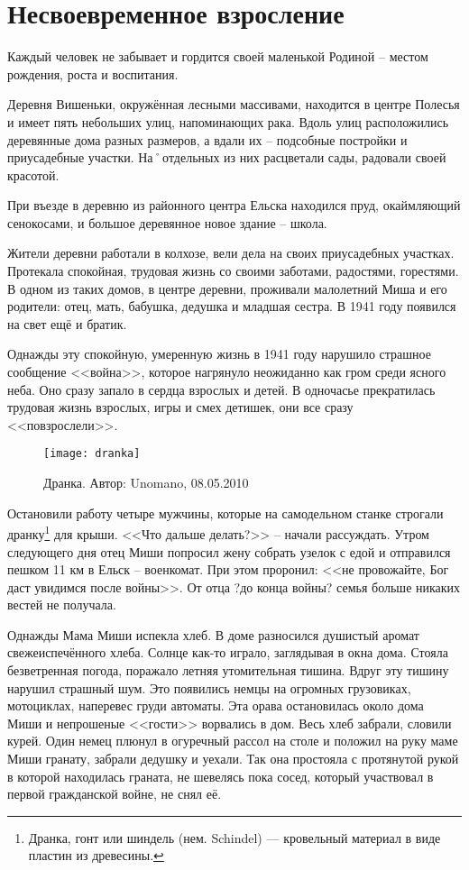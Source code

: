 ﻿\chapter{Несвоевременное взросление}
Каждый человек не забывает и гордится своей маленькой Родиной \--- местом рождения, роста и воспитания.

Деревня Вишеньки, окружённая лесными массивами, находится в центре Полесья и имеет пять небольших улиц, напоминающих рака. Вдоль улиц расположились деревянные дома разных размеров, а вдали их \--- подсобные постройки и приусадебные участки. На˚отдельных из них расцветали сады, радовали своей красотой.

При въезде в деревню из районного центра Ельска находился пруд, окаймляющий сенокосами, и большое деревянное новое здание \--- школа. 

Жители деревни работали в колхозе, вели дела на своих приусадебных участках. Протекала спокойная, трудовая жизнь со своими заботами, радостями, горестями. В одном из таких домов, в центре деревни, проживали малолетний Миша и его родители: отец, мать, бабушка, дедушка и младшая сестра. В 1941 году появился на свет ещё и братик. 

Однажды эту спокойную, умеренную жизнь в 1941 году нарушило страшное сообщение <<война>>, которое нагрянуло неожиданно как гром среди ясного неба. Оно сразу запало в сердца взрослых и детей. В одночасье прекратилась трудовая жизнь взрослых, игры и смех детишек, они все сразу <<повзрослели>>. 

\begin{wrapfigure}{O}{.4\textwidth}
\centering
\texttt{[image: dranka]}
\caption{Дранка. Автор: Unomano, 08.05.2010}
\label{fig:dranka}
\end{wrapfigure}

Остановили работу четыре мужчины, которые на самодельном станке строгали дранку\footnote{Дранка, гонт или шиндель (нем. Schindel) — кровельный материал в виде пластин из древесины.} для крыши. <<Что дальше делать?>> \--- начали рассуждать. Утром следующего дня отец Миши попросил жену собрать узелок с едой и отправился пешком 11 км в Ельск \--- военкомат. При этом проронил: <<не провожайте, Бог даст увидимся после войны>>. От отца ?до конца войны? семья больше никаких вестей не получала. 

Однажды Мама Миши испекла хлеб. В доме разносился душистый аромат свежеиспечённого хлеба. Солнце как-то играло, заглядывая в окна дома. Стояла безветренная погода, поражало летняя утомительная тишина. Вдруг эту тишину нарушил страшный шум. Это появились немцы на огромных грузовиках, мотоциклах, наперевес груди автоматы. Эта орава остановилась около дома Миши и непрошеные <<гости>> ворвались в дом. Весь хлеб забрали, словили курей. Один немец плюнул в огуречный рассол на столе и положил на руку маме Миши гранату, забрали дедушку и уехали. Так она простояла с протянутой рукой в которой находилась граната, не шевелясь пока сосед, который участвовал в первой гражданской войне, не снял её.

